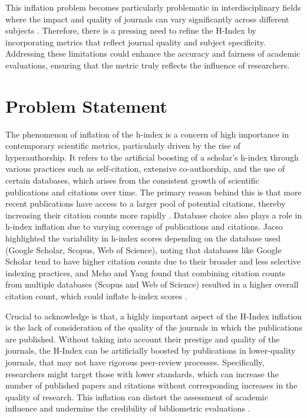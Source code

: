 This inflation problem becomes particularly problematic in interdisciplinary
fields where the impact and quality of journals can vary significantly across
different subjects \cite{hirsch2005index,waltman2012inconsistency}. Therefore,
there is a pressing need to refine the H-Index by incorporating metrics that
reflect journal quality and subject specificity. Addressing these limitations
could enhance the accuracy and fairness of academic evaluations, ensuring that
the metric truly reflects the influence of researchers.

\section{Problem Statement}
The phenomenon of inflation of the h-index is a concern of high importance in
contemporary scientific metrics, particularly driven by the rise of
hyperauthorship. It refers to the artificial boosting of a scholar's h-index
through various practices such as self-citation, extensive co-authorship, and
the use of certain databases, which arises from the consistent growth of
scientific publications and citations over time. The primary reason behind this
is that more recent publications have access to a larger pool of potential
citations, thereby increasing their citation counts more rapidly
\cite{norris2010h, koltun2021h, bi2023four}. Database choice also plays a role
in h-index inflation due to varying coverage of publications and citations.
Jacso highlighted the variability in h-index scores depending on the database
used (Google Scholar, Scopus, Web of Science), noting that databases like
Google Scholar tend to have higher citation counts due to their broader and
less selective indexing practices, and Meho and Yang found that combining
citation counts from multiple databases (Scopus and Web of Science) resulted in
a higher overall citation count, which could inflate h-index scores
\cite{norris2010h}.

Crucial to acknowledge is that, a highly important aspect of the H-Index
inflation is the lack of consideration of the quality of the journals in which
the publications are published. Without taking into account their prestige and
quality of the journals, the H-Index can be artificially boosted by
publications in lower-quality journals, that may not have rigorous peer-review
processes. Specifically, researchers might target those with lower standards,
which can increase the number of published papers and citations without
corresponding increases in the quality of research. This inflation can distort
the assessment of academic influence and undermine the credibility of
bibliometric evaluations \cite{tonta2020monetary}.

